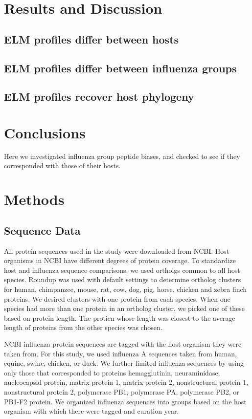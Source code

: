 \documentclass[10pt]{bmc_article}
\newenvironment{bmcformat}{\begin{raggedright}\baselineskip20pt\sloppy\setboolean{publ}{false}}{\end{raggedright}\baselineskip20pt\sloppy}
\begin{document}
\begin{bmcformat}
\section*{Results and Discussion}
  \subsection*{ELM profiles differ between hosts}

  \subsection*{ELM profiles differ between influenza groups}

  \subsection*{ELM profiles recover host phylogeny}

\section*{Conclusions}
Here we investigated influenza group peptide biases, and checked to
see if they corresponded with those of their hosts.
  
\section*{Methods}

\subsection*{Sequence Data}
All protein sequences used in the study were downloaded from
NCBI. Host organisms in NCBI have different degrees of protein
coverage. To standardize host and influenza sequence comparisons, we
used ortholgs common to all host species. Roundup
\cite{deluca2006roundup} was used with default settings to determine
ortholog clusters for human, chimpanzee, mouse, rat, cow, dog, pig,
horse, chicken and zebra finch proteins. We desired clusters with one
protein from each species. When one species had more than one protein
in an ortholog cluster, we picked one of these based on protein
length. The protien whose length was closest to the average length of
proteins from the other species was chosen.

NCBI influenza protein sequences are tagged with the host organism
they were taken from. For this study, we used influenza A sequences
taken from human, equine, swine, chicken, or duck. We further limited
influenza sequences by using only those that corresponded to proteins
hemagglutinin, neuraminidase, nucleocapsid protein, matrix protein 1,
matrix protein 2, nonstructural protein 1, nonstructural protein 2,
polymerase PB1, polymerase PA, polymerase PB2, or PB1-F2 protein. We
organized influenza sequences into groups based on the host organism
with which there were tagged and curation year.


\end{bmcformat}
\end{document}
